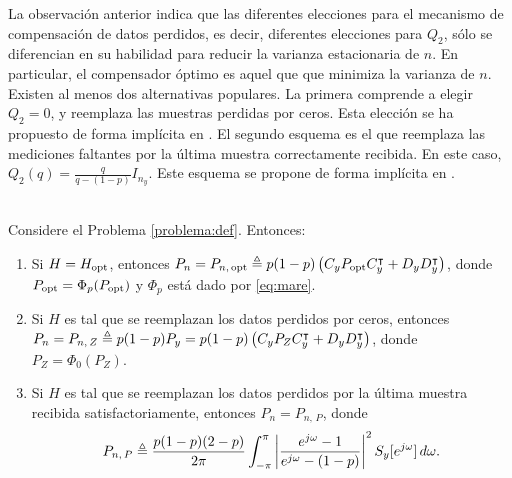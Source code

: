 La observaci\'on anterior indica que las diferentes elecciones para el mecanismo de compensaci\'on de datos perdidos, es decir, diferentes elecciones para $Q_2$, s\'olo se diferencian en su habilidad para reducir la varianza estacionaria de $n$. En particular, el compensador \'optimo es aquel que que minimiza la varianza de $n$. Existen al menos dos alternativas populares. La primera comprende a elegir $Q_2=0$, y reemplaza las muestras perdidas por ceros. Esta elecci\'on se ha propuesto de forma impl\'icita en \cite{nahi69, tugnai81, hadsch79, costa94}. El segundo esquema es el que reemplaza las mediciones faltantes por la \'ultima muestra correctamente recibida. En este caso, $Q_2(q)=\frac{q}{q-(1-p)}I_{n_y}$. Este esquema se propone de forma impl\'icita en \cite{sachsh07, suxixi08, lichpa10}.

\begin{lema}\label{lema:Pq}{\ \\}
Considere el Problema \ref{problema:def}. Entonces:
\begin{enumerate}
\item Si $H=H_{\operatorname{opt}}$, entonces $P_n= P_{n,\, \operatorname{opt}} \triangleq p(1-p) \left( C_y P_{\operatorname{opt}} C_y^{\intercal} + D_yD_y^{\intercal}\right)$, donde $P_{\operatorname{opt}} = \Phi_{p}(P_{\operatorname{opt}})$ y $\Phi_p$ est\'a dado por \eqref{eq:mare}.
\item Si $H$ es tal que se reemplazan los datos perdidos por ceros, entonces $P_n = P_{n, \, Z} \triangleq p(1-p)P_y = p(1-p) \left( C_y P_Z C_y^{\intercal} + D_yD_y^{\intercal} \right)$, donde $P_Z = \Phi_{0}(P_Z)$.
\item Si $H$ es tal que se reemplazan los datos perdidos por la \'ultima muestra recibida satisfactoriamente, entonces $P_n = P_{n,\, P}$, donde
\begin{align}\label{eq:Pq-pasado}
P_{n, \, P} \triangleq  \frac{p(1-p)(2-p) }{2\pi}\int_{-\pi}^{\pi} \left\vert  \frac{e^{j\omega}-1}{e^{j\omega}-(1-p)}  \right\vert^2 S_y[e^{j\omega}] \,  d\omega.
\end{align}
\end{enumerate}
\end{lema}


